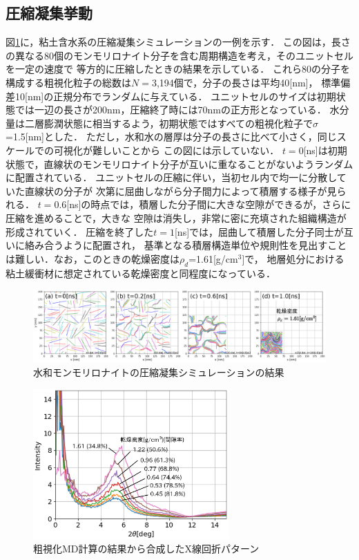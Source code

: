 ﻿\documentclass[11pt,a4j]{jarticle}
\begin{document}
\subsection{圧縮凝集挙動}
図\ref{fig:fig2}に，粘土含水系の圧縮凝集シミュレーションの一例を示す．
この図は，長さの異なる80個のモンモリロナイト分子を含む周期構造を考え，そのユニットセルを一定の速度で
等方的に圧縮したときの結果を示している．
これら80の分子を構成する粗視化粒子の総数は$N=$3,194個で，分子の長さは平均40[nm]，
標準偏差10[nm]の正規分布でランダムに与えている．
ユニットセルのサイズは初期状態では一辺の長さが200nm，圧縮終了時には70nmの正方形となっている．
水分量は二層膨潤状態に相当するよう，初期状態ではすべての粗視化粒子で$\sigma$=1.5[nm]とした．
ただし，水和水の層厚は分子の長さに比べて小さく，同じスケールでの可視化が難しいことから
この図には示していない．
$t=0$[ns]は初期状態で，直線状のモンモリロナイト分子が互いに重なることがないようランダムに配置されている．
ユニットセルの圧縮に伴い，当初セル内で均一に分散していた直線状の分子が
次第に屈曲しながら分子間力によって積層する様子が見られる．
$t=$0.6[ns]の時点では，積層した分子間に大きな空隙ができるが，さらに圧縮を進めることで，大きな
空隙は消失し，非常に密に充填された組織構造が形成されていく．
圧縮を終了した$t=1$[ns]では，屈曲して積層した分子同士が互いに絡み合うように配置され，
基準となる積層構造単位や規則性を見出すことは難しい．なお，このときの乾燥密度は$\rho_d$=1.61[g/cm$^3$]で，
地層処分における粘土緩衝材に想定されている乾燥密度と同程度になっている．
\begin{figure}[h]
	\begin{center}
	\includegraphics[width=1.0\linewidth]{Figs/revs.eps} 
	\end{center}
	\vspace{-5mm}
	\caption{水和モンモリロナイトの圧縮凝集シミュレーションの結果} 
	\label{fig:fig2}
\end{figure}
\vspace{-4mm}
\begin{figure}
	\centering
	\includegraphics[keepaspectratio,width=75mm]{Figs/xrd.eps}
	\vspace{-5mm}
	\caption{粗視化MD計算の結果から合成したX線回折パターン}
	\label{fig:fig3}
\end{figure}
\vspace{-8mm}
\end{document}
